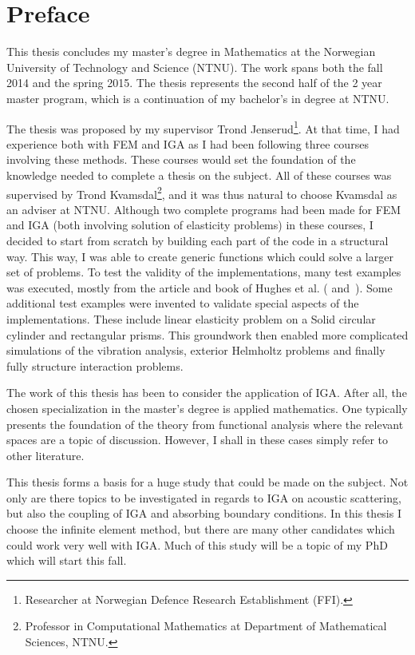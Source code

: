 \section{Preface}
This thesis concludes my master's degree in Mathematics at the Norwegian University of Technology and Science (NTNU). The work spans both the fall 2014 and the spring 2015. The thesis represents the second half of the 2 year master program, which is a continuation of my bachelor's in degree at NTNU.

The thesis was proposed by my supervisor Trond Jenserud\footnote{Researcher at Norwegian Defence Research Establishment (FFI).}. At that time, I had experience both with FEM and IGA as I had been following three courses involving these methods. These courses would set the foundation of the knowledge needed to complete a thesis on the subject. All of these courses was supervised by Trond Kvamsdal\footnote{Professor in Computational Mathematics at Department of Mathematical Sciences, NTNU.}, and it was thus natural to choose Kvamsdal as an adviser at NTNU. Although two complete programs had been made for FEM and IGA (both involving solution of elasticity problems) in these courses, I decided to start from scratch by building each part of the code in a structural way. This way, I was able to create generic functions which could solve a larger set of problems. To test the validity of the implementations, many test examples was executed, mostly from the article and book of Hughes et al. (\cite{Hughes2005iac} and~\cite{Cottrell2009iat}). Some additional test examples were invented to validate special aspects of the implementations. These include linear elasticity problem on a Solid circular cylinder and rectangular prisms. This groundwork then enabled more complicated simulations of the vibration analysis, exterior Helmholtz problems and finally fully structure interaction problems. 

The work of this thesis has been to consider the application of IGA. After all, the chosen specialization in the master's degree is applied mathematics. One typically presents the foundation of the theory from functional analysis where the relevant spaces are a topic of discussion. However, I shall in these cases simply refer to other literature.

This thesis forms a basis for a huge study that could be made on the subject. Not only are there topics to be investigated in regards to IGA on acoustic scattering, but also the coupling of IGA and absorbing boundary conditions. In this thesis I choose the infinite element method, but there are many other candidates which could work very well with IGA. Much of this study will be a topic of my PhD which will start this fall.

